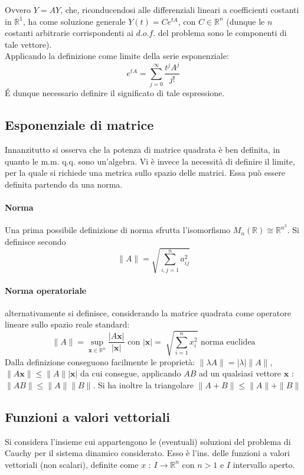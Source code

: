 \documentclass[10pt]{article}
\theoremstyle{plain}
\begin{document}
Ovvero $\dot{Y} = A Y$, che, riconducendosi alle differenziali lineari a coefficienti costanti in $\mathbb{R}^1$, ha come soluzione generale $\displaystyle Y(t) = C e^{t A}$, con $C \in \mathbb{R}^n$ (dunque le $n$ costanti arbitrarie corrispondenti ai $d.o.f.$ del problema sono le componenti di tale vettore).
\\Applicando la definizione come limite della serie esponenziale:
\[e^{t A} = \sum \limits_{j = 0}^\infty \frac{t^j A^j}{j!}\]
\'E dunque necessario definire il significato di tale espressione.

\subsection{Esponenziale di matrice}
Innanzitutto si osserva che la potenza di matrice quadrata è ben definita, in quanto le m.m. q.q. sono un'algebra. Vi è invece la necessità di definire il limite, per la quale si richiede una metrica sullo spazio delle matrici. Essa può essere definita partendo da una norma.
\paragraph{Norma}
Una prima possibile definizione di norma sfrutta l'isomorfismo $M_n(\mathbb{R}) \cong \mathbb{R}^{n^2}$. Si definisce secondo 
\[\|A\| = \sqrt{\sum \limits_{i,j = 1}^n a_{ij}^2}\]

\paragraph{Norma operatoriale} alternativamente si definisce, considerando la matrice quadrata come operatore lineare sullo spazio reale standard:
\[\|A\| = \sup\limits_{\displaystyle \mathbf{x} \in \mathbb{R}^n} \frac{|A\mathbf{x}|}{|\mathbf{x}|} \textrm{ con } |\mathbf{x}| = \sqrt[]{\sum\limits_{i=1}^n x_i^2} \textrm{ norma euclidea}\]
Dalla definizione conseguono facilmente le proprietà: $\displaystyle \|\lambda A\| = |\lambda| \|A\|$, $\displaystyle \|A \mathbf{x}\| \leq \|A\| |\mathbf{x}|$ da cui consegue, applicando $AB$ ad un qualsiasi vettore $\mathbf{x}$ : $\displaystyle \|AB\| \leq \|A\| \|B\|$. Si ha inoltre la triangolare $\displaystyle \|A + B\| \leq \|A\| + \|B\|$

\subsection{Funzioni a valori vettoriali}
Si considera l'insieme cui appartengono le (eventuali) soluzioni del problema di Cauchy per il sistema dinamico considerato. Esso è l'ins. delle funzioni a valori vettoriali (non scalari), definite come $\displaystyle x$ : $I \rightarrow \mathbb{R}^n$ con $n > 1$ e $I$ intervallo aperto.
\end{document}

